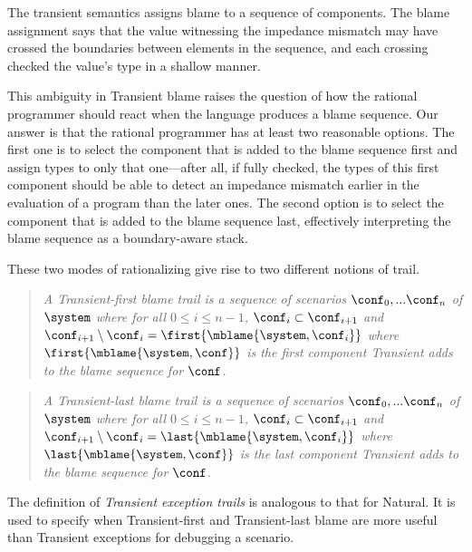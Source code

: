 
The transient semantics assigns blame to a sequence of components. The blame
assignment says that the value witnessing the impedance mismatch may have
crossed the boundaries between elements in the sequence, and each crossing
checked the value's type in a shallow manner.

This ambiguity in Transient blame raises the question of how the rational
programmer should react when the language produces a blame sequence. Our answer
is that the rational programmer has at least two reasonable options. The first
one is to select the component that is added to the blame sequence first and
assign types to only that one---after all, if fully checked, the types of this
first component should be able to detect an impedance mismatch earlier in the
evaluation of a program than the later ones. The second option is to select the
component that is added to the blame sequence last, effectively interpreting the
blame sequence as a boundary-aware stack.

These two modes of rationalizing give rise to two different notions of trail.

\begin{quote}
\it A \emph{Transient-first blame trail} is a sequence of scenarios
$\conf_0,...\conf_n$ of $\system$ where for all $0 \leq i \leq n - 1$,
$\conf_i \subset \conf_{i+1}$ and $\conf_{i+1} \setminus \conf_i =
\first{\mblame{\system, \conf_i}}$ where $\first{\mblame{\system, \conf}}$ is the
first component Transient adds to the blame sequence for $\conf$.
\end{quote}

\begin{quote}
\it A \emph{Transient-last blame trail} is a sequence of scenarios
$\conf_0,...\conf_n$ of $\system$ where for all $0 \leq i \leq n - 1$,
$\conf_i \subset \conf_{i+1}$ and $\conf_{i+1} \setminus \conf_i =
  \last{\mblame{\system, \conf_i}}$ where $\last{\mblame{\system, \conf}}$ is the
last component Transient adds to the blame sequence for $\conf$.
\end{quote}

The definition of \emph{Transient exception trails} is analogous to that for
Natural. It is used to specify when Transient-first and Transient-last blame are
more useful than Transient exceptions for debugging a scenario.

